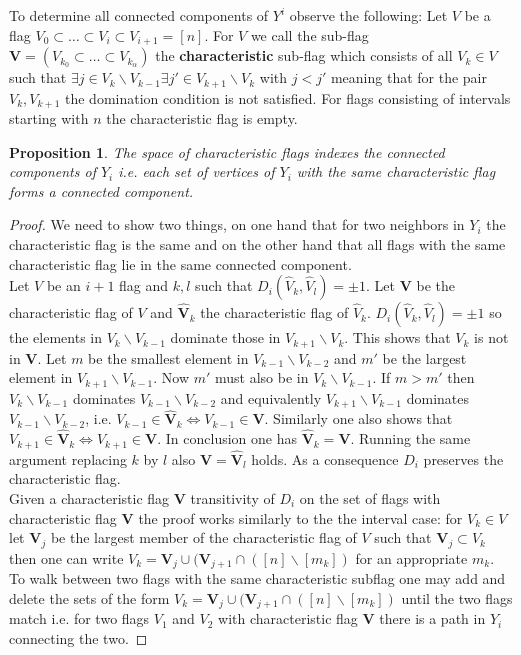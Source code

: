 \documentclass[11pt]{amsart}
\newtheorem{proposition}[theorem]{Proposition}
\begin{document}
    To determine all connected components of $Y^i$ observe the following: Let $V$ be a flag $V_0\subset\dots\subset V_i\subset V_{i+1}=[n]$. For $V$ we call the sub-flag $\mathbf{V}=(V_{k_0}\subset\dots\subset V_{k_\alpha})$ the \textbf{characteristic} sub-flag which consists of all  $V_k\in V$ such that $\exists j\in V_k\backslash V_{k-1}\exists j'\in V_{k+1}\backslash V_k$ with $j<j'$ meaning that for the pair $V_k,V_{k+1}$ the domination condition is not satisfied. For flags consisting of intervals starting with $n$ the characteristic flag is empty. 
    \begin{proposition}
        The space of characteristic flags indexes the connected components of $Y_i$ i.e. each set of vertices of $Y_i$ with the same characteristic flag forms a connected component.
        \label{prop:BlockIntervals}
    \end{proposition}
    \begin{proof}
        We need to show two things, on one hand that for two neighbors in $Y_i$ the characteristic flag is the same and on the other hand that all flags with the same characteristic flag lie in the same connected component.\\ 
        Let $V$ be an $i+1$ flag and $k,l$ such that $D_i(\hat{V}_k,\hat{V}_l)=\pm 1$. Let $\mathbf{V}$ be the characteristic flag of $V$ and $\hat{\mathbf{V}}_k$ the characteristic flag of  $\hat{V}_k$. $D_i(\hat{V}_k,\hat{V}_l)=\pm 1$ so the elements in $V_k\backslash V_{k-1}$ dominate those in $V_{k+1}\backslash V_k$. This shows that $V_k$ is not in $\mathbf{V}$. Let $m$ be the smallest element in $V_{k-1}\backslash V_{k-2}$ and $m'$ be the largest element in $V_{k+1}\backslash V_{k-1}$. Now $m'$ must also be in $V_k\backslash V_{k-1}$. If $m>m'$ then $V_k\backslash V_{k-1}$ dominates $V_{k-1}\backslash V_{k-2}$ and equivalently $V_{k+1}\backslash V_{k-1}$ dominates $V_{k-1}\backslash V_{k-2}$, i.e. $V_{k-1}\in \hat{\mathbf{V}}_k\Leftrightarrow V_{k-1}\in \mathbf{V}$. Similarly one also shows that $V_{k+1}\in \hat{\mathbf{V}}_k\Leftrightarrow V_{k+1}\in \mathbf{V}$. In conclusion one has $\hat{\mathbf{V}}_k=\mathbf{V}$. Running the same argument replacing $k$ by $l$  also   $\mathbf{V}=\hat{\mathbf{V}}_l$ holds. As a consequence $D_i$ preserves the characteristic flag.\\
        Given a characteristic flag $\mathbf{V}$ transitivity of $D_i$ on the set of flags with characteristic flag $\mathbf{V}$ the proof works similarly to the the interval case: for $V_k\in V$ let  $\mathbf{V}_j$ be the largest member of the characteristic flag of $V$ such that $\mathbf{V}_j\subset V_k$ then one can write $V_k=\mathbf{V}_j\cup(\mathbf{V}_{j+1}\cap ([n]\backslash[m_k])$ for an appropriate $m_k$. To walk between two flags with the same characteristic subflag one may add and delete the sets of the form $V_k=\mathbf{V}_j\cup(\mathbf{V}_{j+1}\cap ([n]\backslash[m_k])$ until the two flags match i.e. for two flags $V_1$ and $V_2$ with characteristic flag $\mathbf{V}$ there is a path in $Y_i$ connecting the two.
    \end{proof}
\end{document}
